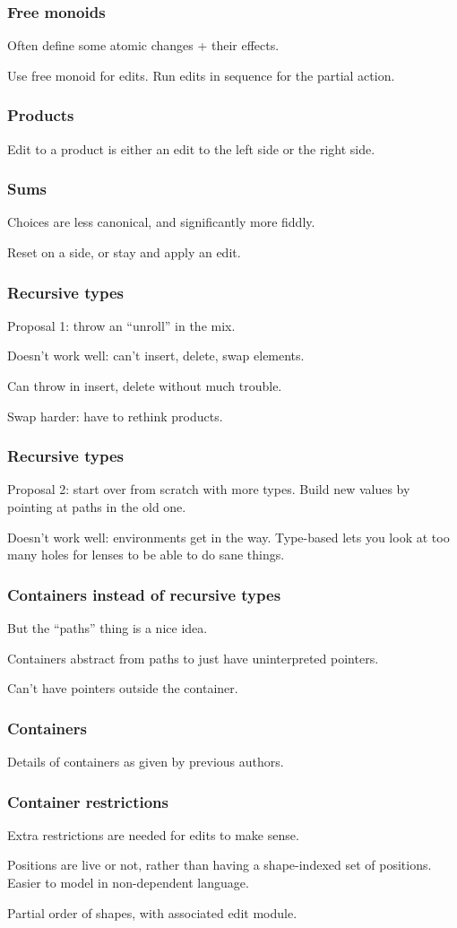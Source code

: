 \documentclass{beamer}
\begin{document}
\begin{frame}
    \frametitle{Free monoids}
    Often define some atomic changes + their effects.

    Use free monoid for edits. Run edits in sequence for the partial action.
\end{frame}

\begin{frame}
    \frametitle{Products}
    Edit to a product is either an edit to the left side or the right side.
\end{frame}

\begin{frame}
    \frametitle{Sums}
    Choices are less canonical, and significantly more fiddly.

    Reset on a side, or stay and apply an edit.
\end{frame}

\begin{frame}
    \frametitle{Recursive types}
    Proposal 1: throw an ``unroll'' in the mix.

    Doesn't work well: can't insert, delete, swap elements.

    Can throw in insert, delete without much trouble.

    Swap harder: have to rethink products.
\end{frame}

\begin{frame}
    \frametitle{Recursive types}
    Proposal 2: start over from scratch with more types. Build new values by
    pointing at paths in the old one.

    Doesn't work well: environments get in the way. Type-based lets you look
    at too many holes for lenses to be able to do sane things.
\end{frame}

\begin{frame}
    \frametitle{Containers instead of recursive types}
    But the ``paths'' thing is a nice idea.

    Containers abstract from paths to just have uninterpreted pointers.

    Can't have pointers outside the container.
\end{frame}

\begin{frame}
    \frametitle{Containers}
    Details of containers as given by previous authors.
\end{frame}

\begin{frame}
    \frametitle{Container restrictions}
    Extra restrictions are needed for edits to make sense.

    Positions are live or not, rather than having a shape-indexed set of
    positions. Easier to model in non-dependent language.

    Partial order of shapes, with associated edit module.
\end{frame}
\end{document}
